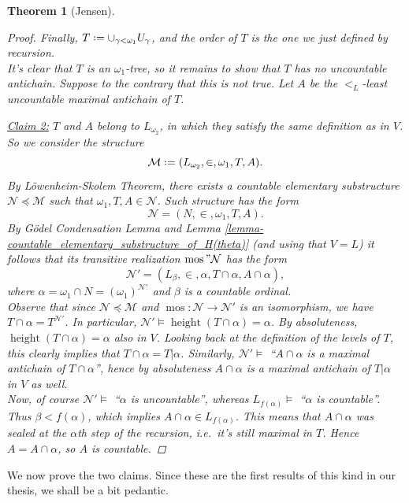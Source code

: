 \documentclass[11pt,a4paper]{report}
\newtheorem{theorem}{Theorem}[chapter] %
\theoremstyle{definition}
\theoremstyle{num.custom-title}
\theoremstyle{custom-title}
\newenvironment{claim}[1]{\par\noindent\underline{Claim#1:}\space}{} %
\DeclareMathOperator{\height}{height}
\DeclareMathOperator{\mos}{mos}
\newcommand{\M}{\mathcal{M}}
\newcommand*{\defeq}{\mathrel{\rlap{%
                     \raisebox{0.3ex}{$\cdot$}}%
                     \raisebox{-0.3ex}{$\cdot$}}%
                     =}
\begin{document}
\begin{theorem}[Jensen]
\begin{proof}
Finally, $T \defeq \cup_{\gamma < \omega_1} U_\gamma$, and the order of $T$ is the one we just defined by recursion.\\
It's clear that $T$ is an $\omega_1$-tree, so it remains to show that $T$ has no uncountable antichain. Suppose to the contrary that this is not true. Let $A$ be the $<_L$-least uncountable maximal antichain of $T$.\\[-7pt]
\begin{claim}{ 2}
$T$ and $A$ belong to $L_{\omega_2}$, in which they satisfy the same definition as in $V$.
\end{claim}\\[-7pt]

So we consider the structure
\[
\M \defeq (L_{\omega_2}, \in, \omega_1, T, A).
\]
By Löwenheim-Skolem Theorem, there exists a countable elementary substructure $\mathcal{N} \preceq \M$ such that $\omega_1, T, A \in \mathcal{N}$. Such structure has the form
\[
\mathcal{N} = (N, \in, \omega_1, T, A).
\]
By Gödel Condensation Lemma and Lemma \ref{lemma-countable_elementary_substructure_of_H(theta)} (and using that $V=L$) it follows that its transitive realization $\mos"\mathcal{N}$ has the form
\[
\mathcal{N'} = (L_\beta, \in, \alpha, T \cap \alpha, A \cap \alpha),
\]
where $\alpha = \omega_1 \cap N = (\omega_1)^{\mathcal{N'}}$ and $\beta$ is a countable ordinal.\\
Observe that since $\mathcal{N} \preceq \M$ and $\mos \colon \mathcal{N} \to \mathcal{N'}$ is an isomorphism, we have $T \cap \alpha = T^{\mathcal{N'}}$. In particular, $\mathcal{N'} \models \height(T \cap \alpha)=\alpha$. By absoluteness, $\height(T \cap \alpha)=\alpha$ also in $V$. Looking back at the definition of the levels of $T$, this clearly implies that $T \cap \alpha = T|\alpha$. Similarly, $\mathcal{N'} \models$ ``$A \cap \alpha$ is a maximal antichain of $T \cap \alpha$'', hence by absoluteness $A \cap \alpha$ is a maximal antichain of $T|\alpha$ in $V$ as well.\\
Now, of course $\mathcal{N'} \models$ ``$\alpha$ is uncountable'', whereas $L_{f(\alpha)} \models$ ``$\alpha$ is countable''. Thus $\beta < f(\alpha)$, which implies $A \cap \alpha \in L_{f(\alpha)}$. This means that $A \cap \alpha$ was sealed at the $\alpha$th step of the recursion, i.e.\ it's still maximal in $T$. Hence $A = A \cap \alpha$, so $A$ is countable.
\end{proof}
\end{theorem}

We now prove the two claims. Since these are the first results of this kind in our thesis, we shall be a bit pedantic.
\end{document}
